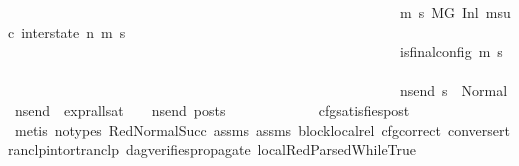\begin{isabellebody}
\ \ \ \ \ \ \ \ \ \ \ \ \ \ \ \ \ \ \ \ \ \ \ \ \ \ \ \ \ \ \ \ \ \ \ \ \ \ \ \ \ \ \ \ \ \ \ \ \ \ \ \ \ \ \ \ {\isacharparenleft}{\kern0pt}{\isasymforall}m{\isacharprime}{\kern0pt}\ s{\isacharprime}{\kern0pt}{\isachardot}{\kern0pt}\ {\isacharparenleft}{\kern0pt}{\isacharparenleft}{\kern0pt}M{\isacharcomma}{\kern0pt}{\isasymLambda}{\isacharcomma}{\kern0pt}{\isasymGamma}{\isacharcomma}{\kern0pt}{\isasymOmega}{\isacharcomma}{\kern0pt}G\ {\isasymturnstile}{\isacharparenleft}{\kern0pt}Inl\ {\isacharparenleft}{\kern0pt}msuc{}{\isacharparenright}{\kern0pt}{\isacharcomma}{\kern0pt}\ inter{\isacharunderscore}{\kern0pt}state{\isacharparenright}{\kern0pt}\ {\isacharminus}{\kern0pt}n{\isasymrightarrow}{\isacharasterisk}{\kern0pt}\ {\isacharparenleft}{\kern0pt}m{\isacharprime}{\kern0pt}{\isacharcomma}{\kern0pt}\ s{\isacharprime}{\kern0pt}{\isacharparenright}{\kern0pt}{\isacharparenright}{\kern0pt}\ {\isasymlongrightarrow}\isanewline
\ \ \ \ \ \ \ \ \ \ \ \ \ \ \ \ \ \ \ \ \ \ \ \ \ \ \ \ \ \ \ \ \ \ \ \ \ \ \ \ \ \ \ \ \ \ \ \ \ \ \ \ \ \ \ \ is{\isacharunderscore}{\kern0pt}final{\isacharunderscore}{\kern0pt}config\ {\isacharparenleft}{\kern0pt}m{\isacharprime}{\kern0pt}{\isacharcomma}{\kern0pt}\ s{\isacharprime}{\kern0pt}{\isacharparenright}{\kern0pt}\ {\isasymlongrightarrow}\ \isanewline
\ \ \ \ \ \ \ \ \ \ \ \ \ \ \ \ \ \ \ \ \ \ \ \ \ \ \ \ \ \ \ \ \ \ \ \ \ \ \ \ \ \ \ \ \ \ \ \ \ \ \ \ \ \ \ \ {\isacharparenleft}{\kern0pt}{\isasymforall}ns{\isacharunderscore}{\kern0pt}end{\isachardot}{\kern0pt}\ s{\isacharprime}{\kern0pt}\ {\isacharequal}{\kern0pt}\ Normal\ ns{\isacharunderscore}{\kern0pt}end\ {\isasymlongrightarrow}\ {\isacharparenleft}{\kern0pt}expr{\isacharunderscore}{\kern0pt}all{\isacharunderscore}{\kern0pt}sat\ {\isasymLambda}\ {\isasymGamma}\ {\isasymOmega}\ ns{\isacharunderscore}{\kern0pt}end{\isacharparenright}{\kern0pt}\ posts{\isacharparenright}{\kern0pt}{\isacharparenright}{\kern0pt}{\isacharparenright}{\kern0pt}\ {\isacharparenright}{\kern0pt}{\isachardoublequoteclose}\isanewline
\ \ \ \ \ \ \ \ \ \ \isamarkupfalse%
\ cfg{\isacharunderscore}{\kern0pt}satisfies{\isacharunderscore}{\kern0pt}post\isanewline
\ \ \ \ \ \ \ \ \ \ \isamarkupfalse%
\ {\isacharparenleft}{\kern0pt}metis\ {\isacharparenleft}{\kern0pt}no{\isacharunderscore}{\kern0pt}types{\isacharparenright}{\kern0pt}\ RedNormalSucc\ assms{\isacharparenleft}{\kern0pt}{}{\isacharparenright}{\kern0pt}\ assms{\isacharparenleft}{\kern0pt}{}{\isacharparenright}{\kern0pt}\ block{\isacharunderscore}{\kern0pt}local{\isacharunderscore}{\kern0pt}rel\ cfg{\isacharunderscore}{\kern0pt}correct\ converse{\isacharunderscore}{\kern0pt}rtranclp{\isacharunderscore}{\kern0pt}into{\isacharunderscore}{\kern0pt}rtranclp\ dag{\isacharunderscore}{\kern0pt}verifies{\isacharunderscore}{\kern0pt}propagate{\isacharunderscore}{\kern0pt}{}\ local{\isachardot}{\kern0pt}RedParsedWhileTrue{\isacharparenleft}{\kern0pt}{}{\isacharparenright}{\kern0pt}{\isacharparenright}{\kern0pt}\isanewline

\end{isabellebody}
